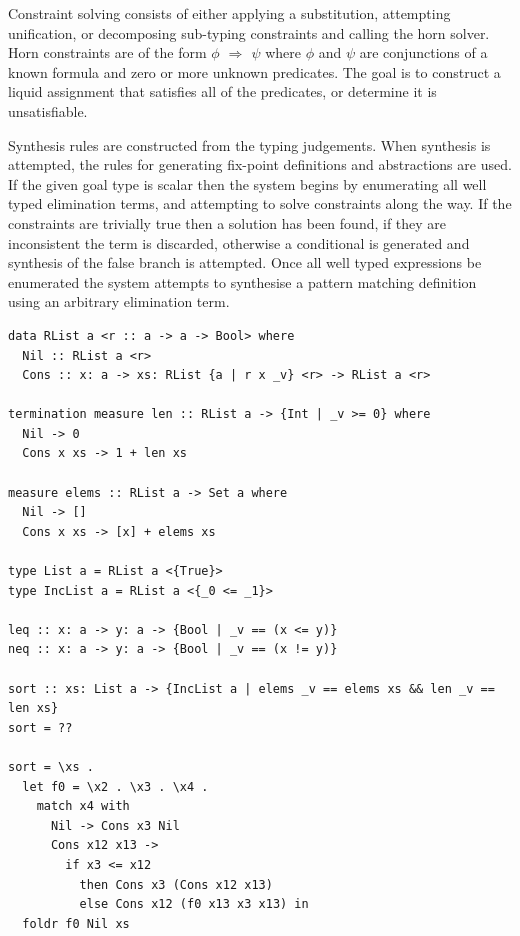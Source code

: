 \documentclass[a4paper]{article}
\begin{document}
Constraint solving consists of either applying a substitution, attempting unification, or decomposing sub-typing constraints 
and calling the horn solver. Horn constraints are of the form \emph{\(\phi\) \(\Rightarrow\) \(\psi\)} where \(\phi\) and \(\psi\) are conjunctions of a 
known formula and zero or more unknown predicates. The goal is to construct a liquid assignment that satisfies all of the 
predicates, or determine it is unsatisfiable.  

Synthesis rules are constructed from the typing judgements. When synthesis is attempted, the rules for generating 
fix-point definitions and abstractions are used. If the given goal type is scalar then the system begins by enumerating 
all well typed elimination terms, and attempting to solve constraints along the way. If the constraints are trivially 
true then a solution has been found, if they are inconsistent the term is discarded, otherwise a conditional is generated 
and synthesis of the false branch is attempted. Once all well typed expressions be enumerated the system attempts
to synthesise a pattern matching definition using an arbitrary elimination term.

\begin{center}
\begin{verbatim}
data RList a <r :: a -> a -> Bool> where
  Nil :: RList a <r>
  Cons :: x: a -> xs: RList {a | r x _v} <r> -> RList a <r>

termination measure len :: RList a -> {Int | _v >= 0} where
  Nil -> 0
  Cons x xs -> 1 + len xs  

measure elems :: RList a -> Set a where
  Nil -> []
  Cons x xs -> [x] + elems xs  

type List a = RList a <{True}>
type IncList a = RList a <{_0 <= _1}>  

leq :: x: a -> y: a -> {Bool | _v == (x <= y)}
neq :: x: a -> y: a -> {Bool | _v == (x != y)} 

sort :: xs: List a -> {IncList a | elems _v == elems xs && len _v == len xs}
sort = ??

sort = \xs .
  let f0 = \x2 . \x3 . \x4 .
	match x4 with
	  Nil -> Cons x3 Nil
	  Cons x12 x13 ->
		if x3 <= x12
		  then Cons x3 (Cons x12 x13)
		  else Cons x12 (f0 x13 x3 x13) in
  foldr f0 Nil xs
\end{verbatim}
\end{center}
\end{document}
